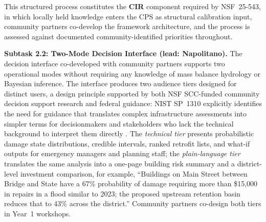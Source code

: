 \documentclass[11pt]{article}
\begin{document}
This structured process constitutes the \textbf{CIR} component required by NSF~25-543,
in which locally held knowledge enters the CPS as structural calibration input, community
partners co-develop the framework architecture, and the process is assessed against
documented community-identified priorities throughout.

\textbf{Subtask 2.2: Two-Mode Decision Interface (lead: Napolitano).}
The decision interface co-developed with community partners supports two operational
modes without requiring any knowledge of mass balance hydrology or Bayesian inference.
The interface produces two audience tiers designed for distinct users, a design principle
supported by both NSF SCC-funded community decision support research
\cite{skilton2022dontwant,habib2023anchoring} and federal guidance: NIST SP~1310 explicitly identifies
the need for guidance that translates complex infrastructure assessments into simpler
terms for decisionmakers and stakeholders who lack the technical background to interpret
them directly \cite[Sec.~6.1.7.4]{davis2024nist}.
The \textit{technical tier} presents probabilistic damage state distributions, credible intervals, ranked retrofit lists, and what-if outputs for emergency managers and planning staff; the \textit{plain-language tier} translates the same analysis into a one-page building risk summary and a district-level investment comparison, for example, ``Buildings on Main Street between Bridge and State have a 67\% probability of damage requiring more than \$15,000 in repairs in a flood similar to 2023; the proposed upstream retention basin reduces that to 43\% across the district.'' Community partners co-design both tiers in Year~1 workshops.
\end{document}
